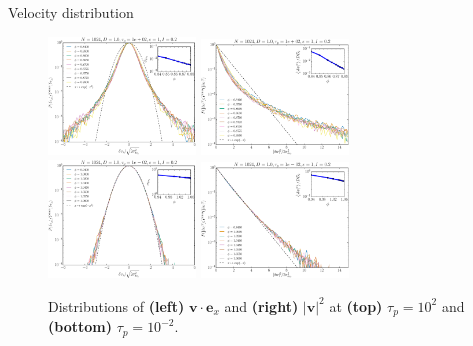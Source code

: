 \documentclass{beamer}
\begin{document}
\begin{frame}{Velocity distribution}

\begin{figure}
\centering
\includegraphics[width=0.35\textwidth]{No1024_Fl1000_Vl0000_Tl1000_Rj1000.pvx.eps}
\includegraphics[width=0.35\textwidth]{No1024_Fl1000_Vl0000_Tl1000_Rj1000.pv2.eps}\\
\includegraphics[width=0.35\textwidth]{No1024_Fl1000_Vl0000_Tl1000_Rn1000.pvx.eps}
\includegraphics[width=0.35\textwidth]{No1024_Fl1000_Vl0000_Tl1000_Rn1000.pv2.eps}
\caption{Distributions of {\bf (left)} $\boldsymbol{v}\cdot\boldsymbol{e}_x$ and {\bf (right)} $|\boldsymbol{v}|^2$ at {\bf (top)} $\tau_p = 10^2$ and {\bf (bottom)} $\tau_p = 10^{-2}$.}
\end{figure}

\vspace{-10pt}

\end{frame}
\end{document}
